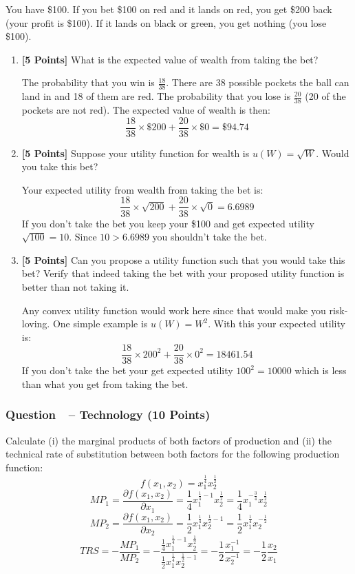 \documentclass[12pt]{article}
\newcounter{question}[section]
\newcommand{\question}[1]{\refstepcounter{question}
  \subsubsection*{Question~\thequestion~-- #1}}
\newenvironment{subquestions}{
  \begin{enumerate}[label=(\roman*)]}{\end{enumerate}}
\begin{document}
You have \$100. If you bet \$100 on red and it lands on red, you get \$200
back (your profit is \$100). If it lands on black or green, you get nothing
(you lose \$100).
\begin{subquestions}
  \item \textbf{[5 Points]} What is the expected value of wealth from taking the bet?

    \textcolor{solution-color}{
      The probability that you win is $\frac{18}{38}$. There are 38 possible
      pockets the ball can land in and 18 of them are red. The probability that
      you lose is $\frac{20}{38}$ (20 of the pockets are not red).
      The expected value of wealth is then:
      \[
        \frac{18}{38} \times \$200 + \frac{20}{38} \times \$0 = \$ 94.74
      \]
    }
  \item \textbf{[5 Points]} Suppose your utility function for wealth is $u\left( W
    \right)=\sqrt{W}$. Would you take this bet?

    \textcolor{solution-color}{
      Your expected utility from wealth from taking the bet is:
      \[
        \frac{18}{38} \times \sqrt{200} + \frac{20}{38} \times \sqrt{0} =
        6.6989
      \]
      If you don't take the bet you keep your \$100 and get expected utility
      $\sqrt{100}=10$. Since $10> 6.6989$ you shouldn't take the bet.
    }

  \item  \textbf{[5 Points]} Can you propose a utility function such that you would take this bet? Verify that indeed taking the bet with your proposed utility function is better than not taking it.

    \textcolor{solution-color}{
      Any convex utility function would work here since that would make you
      risk-loving. One simple example is $u\left( W \right)=W^2$. With this
      your expected utility is:
      \[
        \frac{18}{38} \times 200^2 + \frac{20}{38} \times 0^2 =
        18461.54
      \]
      If you don't take the bet your get expected utility $100^2=10000$ which
      is less than what you get from taking the bet.
    }
\end{subquestions}

\question{Technology (10 Points)}
Calculate (i) the marginal products of both factors of production and (ii) the
technical rate of substitution between both factors for the following
production function:
\[
  f\left( x_1,x_2 \right)=x_1^{\frac{1}{4}}x_2^{\frac{1}{2}}
\]
\textcolor{solution-color}{
  \[
    MP_1=\frac{\partial f\left( x_1,x_2 \right) }{\partial
    x_1}=\frac{1}{4}x_1^{\frac{1}{4}-1}x_2^{\frac{1}{2}}=
    \frac{1}{4}x_1^{-\frac{3}{4}}x_2^{\frac{1}{2}}
  \]
  \[
    MP_2=\frac{\partial f\left( x_1,x_2 \right) }{\partial
    x_2}=\frac{1}{2}x_1^{\frac{1}{4}}x_2^{\frac{1}{2}-1}=
    \frac{1}{2}x_1^{\frac{1}{4}}x_2^{-\frac{1}{2}}
  \]
  \[
    TRS=-\frac{MP_1}{MP_2}=
    -\frac{\frac{1}{4}x_1^{\frac{1}{4}-1}x_2^{\frac{1}{2}}}
    {\frac{1}{2}x_1^{\frac{1}{4}}x_2^{\frac{1}{2}-1}}=
    -\frac{1}{2}\frac{x_1^{-1}}{x_2^{-1}}=-\frac{1}{2}\frac{x_2}{x_1}
  \]
}
\end{document}
